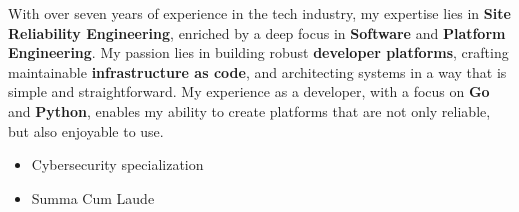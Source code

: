 \documentclass[10pt,a4paper,ragged2e,withhyper,hidelinks]{altacv}
\begin{document}

\begin{fullwidth}
\makecvheader
\end{fullwidth}



\begin{paracol}{2}



\small{With over seven years of experience in the tech industry, my expertise lies in \textbf{Site Reliability Engineering}, enriched by a deep focus in \textbf{Software} and \textbf{Platform Engineering}. My passion lies in building robust \textbf{developer platforms}, crafting maintainable \textbf{infrastructure as code}, and architecting systems in a way that is simple and straightforward. My experience as a developer, with a focus on \textbf{Go} and \textbf{Python}, enables my ability to create platforms that are not only reliable, but also enjoyable to use.}


\switchcolumn




\begin{itemize}
    \setlength{\itemindent}{0em}
    \item   \small{Cybersecurity specialization}
    \item   \small{Summa Cum Laude}
\end{itemize}

\end{paracol}

\medskip
\smallskip
\end{document}
